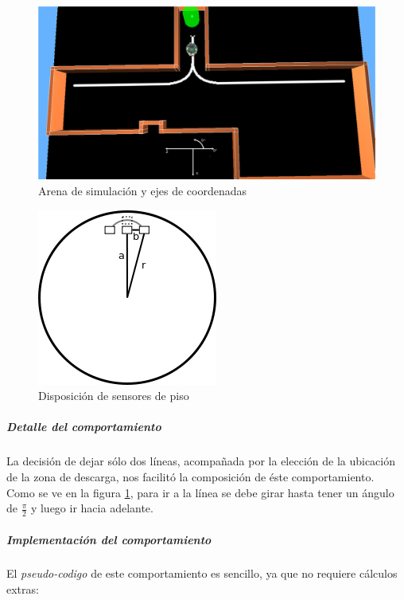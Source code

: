 \begin{figure}[htp]
\begin{center}
\includegraphics[scale=0.3]{comportamientos/arenafinal.png}
\caption{Arena de simulaci\'on y ejes de coordenadas}
\label{fig:arenafinal}
\end{center}
\end{figure}

\begin{figure}[htp]
\begin{center}
\includegraphics[scale=1.0]{comportamientos/floorSensors.png}
\caption{Disposici\'on de sensores de piso}
\label{fig:floorSensors}
\end{center}
\end{figure}

\subparagraph{Detalle del comportamiento}
La decisi\'on de dejar s\'olo dos l\'ineas, acompa\~nada por la elecci\'on de la ubicaci\'on de la
zona de descarga, nos facilit\'o la composici\'on de \'este comportamiento.
\\ Como se ve en la figura \ref{fig:arenafinal}, para ir a la l\'inea se debe girar hasta tener
un \'angulo de $\frac{\pi}{2}$ y luego ir hacia adelante.


\subparagraph{Implementaci\'on del comportamiento}
El \emph{pseudo-codigo} de este comportamiento es sencillo, ya que
no requiere c\'alculos extras:

